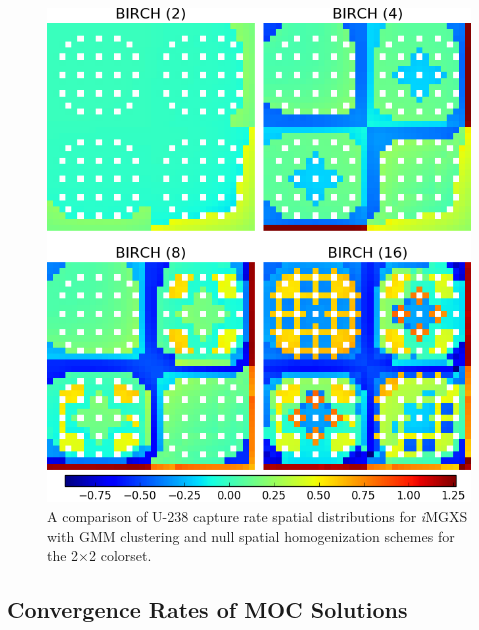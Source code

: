 \documentclass[12pt,twoside]{mitthesis-exec}
\begin{document}
\clearpage

\begin{figure}[h!]
\centering
\includegraphics[width=0.85\linewidth]{figures/results/compare/reflector/compare-capt}
\caption[U-238 capture rate comparison for the colorset]{A comparison of U-238 capture rate spatial distributions for \textit{i}MGXS with GMM clustering and null spatial homogenization schemes for the 2$\times$2 colorset.}
\label{fig:refl-capt-rates-comp}
\end{figure}

\clearpage

\subsection*{Convergence Rates of MOC Solutions}
\end{document}
